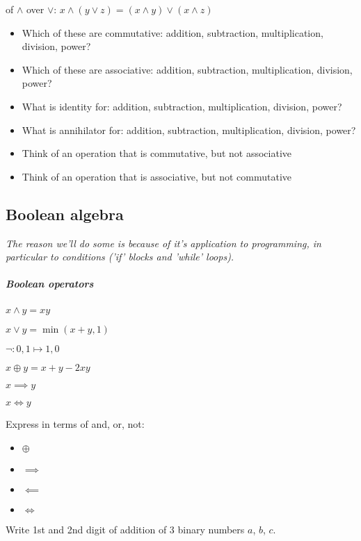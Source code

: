  of $\land$ over $\lor$:  $x \land (y \lor z) = (x \land y) \lor (x \land z)$
\begin{question}
    \begin{itemize}\textit{(make a table)}
        \item Which of these are commutative: addition, subtraction, multiplication, division, power?
        \item Which of these are associative: addition, subtraction, multiplication, division, power?
        \item What is identity for: addition, subtraction, multiplication, division, power?
        \item What is annihilator for: addition, subtraction, multiplication, division, power?
    \end{itemize}
\end{question}
\begin{question}
    \begin{itemize}
        \item Think of an operation that is commutative, but not associative
        \item Think of an operation that is associative, but not commutative
    \end{itemize}
\end{question}


\subsection{Boolean algebra}
\textit{The reason we'll do some is because of it's application to programming, in particular to conditions ('if' blocks and 'while' loops).}
\subparagraph{Boolean operators}
\begin{definition}[Conjunction]
    $x \land y = xy$
\end{definition}
\begin{definition}[Disjunction]
    $x \lor y = \min(x+y,1)$
\end{definition}
\begin{definition}[Negation]
    $\lnot: 0,1 \mapsto 1,0$
\end{definition}
\begin{definition}[Exclusive Or]
    $x \oplus y = x+y-2xy$
\end{definition}
\begin{definition}[Implication]
    $x \implies y$
\end{definition}
\begin{definition}
    $x \iff y$
\end{definition}
\begin{question}
    Express in terms of and, or, not:
    \begin{itemize}
        \item $\oplus$
        \item $\implies$
        \item $\impliedby$
        \item $\iff$
    \end{itemize}
    Write 1st and 2nd digit of addition of 3 binary numbers $a$, $b$, $c$.
\end{question}


